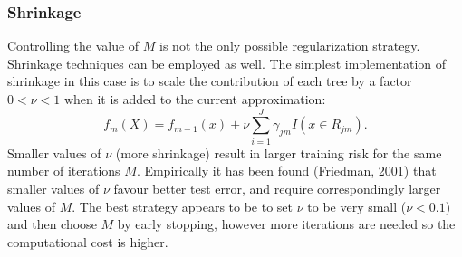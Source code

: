 \subsubsection{Shrinkage}
Controlling the value of $M$ is not the only possible regularization strategy. Shrinkage techniques can be employed as well. The simplest implementation of shrinkage in this case is to scale the contribution of each tree by a factor $0<\nu<1$ when it is added to the current approximation:
\begin{equation}
f_m(X) = f_{m-1}(x) + \nu \sum_{i=1}^J \gamma_{jm}I(x \in R_{jm}).
\end{equation}
Smaller values of $\nu$ (more shrinkage) result in larger training risk for the same number of iterations $M$. Empirically it has been found (Friedman, 2001) that smaller values of $\nu$ favour better test error, and require correspondingly larger values of $M$. The best strategy appears to be to set $\nu$ to be very small ($\nu < 0.1$) and then choose $M$ by early stopping, however more iterations are needed so the computational cost is higher.